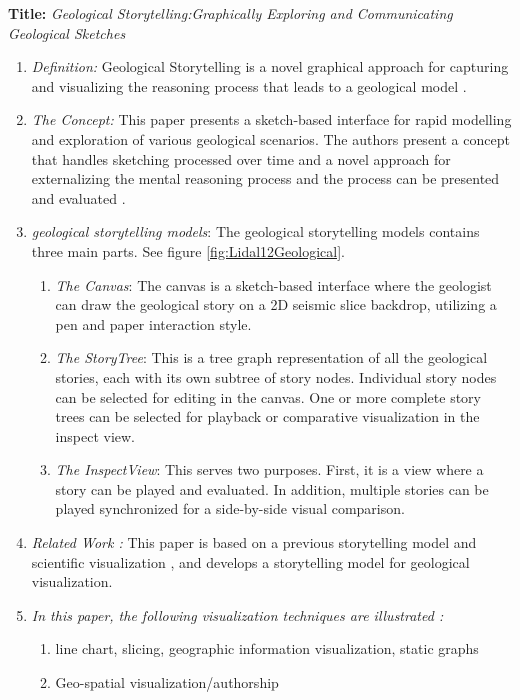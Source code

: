\documentclass{egpubl}
\begin{document}
\textbf{Title:} \textit{Geological Storytelling:Graphically Exploring and Communicating Geological Sketches} 
\begin{enumerate}
\item \textit{Definition:} Geological Storytelling is a novel graphical approach for capturing and visualizing the reasoning process that leads to a geological model \cite{lidal} \cite{Lidal2013}.
\item \textit{The Concept:} This paper presents a sketch-based interface for rapid modelling and exploration of various geological scenarios. The authors present a concept that handles sketching processed over time and a novel approach for externalizing the mental reasoning process and the process can be presented and evaluated \cite{lidal}\cite{Lidal2013}.
\item \textit{geological storytelling models}:
The geological storytelling models contains three main parts. See figure \ref{fig:Lidal12Geological}.
\begin{enumerate}
\item \textit{The Canvas}: The canvas is a sketch-based interface where the geologist can draw the geological story on a 2D seismic slice
backdrop, utilizing a pen and paper interaction style.
\item \textit{The StoryTree}: This is a tree graph representation of all the geological stories, each with its own subtree of story nodes. Individual story nodes can be selected for editing in the canvas. One or more complete story trees can be selected for playback or comparative visualization in the inspect view.

\item \textit{The InspectView}: This serves two purposes. First, it is a view where a story can be played and evaluated. In addition,
multiple stories can be played synchronized for a side-by-side visual comparison.

\end{enumerate}
\item \textit{Related Work :}  This paper is based on a previous storytelling model \cite{wohlfat} and scientific visualization \cite{sci}, and develops a storytelling model for geological visualization.
\item \textit{In this paper, the following visualization techniques are illustrated :} 
\begin{enumerate}
\item line chart, slicing, geographic information visualization, static graphs
\item Geo-spatial visualization/authorship
\end{enumerate}
\end{enumerate}
\end{document}
